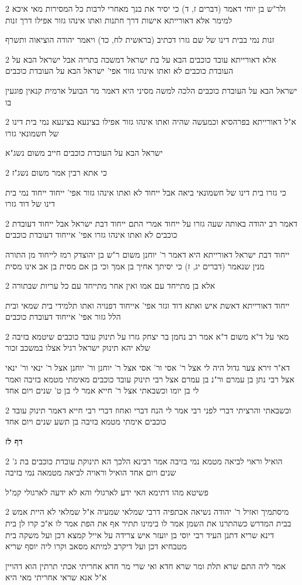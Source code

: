 \documentclass[12pt, openany]{book}
\newcommand{\sethebfont}{
\fontsize{10.5pt}{21.0pt} \selectfont
}
\newcommand{\twocol}[1]{
	{\sethebfont \begin{multicols}{2}
			#1
	\end{multicols}}	
}
\newcommand{\sectname}{}
\newcommand{\newsection}[1]{
	\addcontentsline{toc}{section}{#1}
	\renewcommand{\sectname}{#1}	
	\vspace{-\baselineskip}
	\begin{center}
		\textbf{%
\fontsize{16pt}{16pt}\selectfont
			#1}
	\end{center}
	\vspace{-\baselineskip}
	\nopagebreak
}
\begin{document}
\twocol{ולר"ש בן יוחי דאמר (דברים ז, ד) כי יסיר את בנך מאחרי לרבות כל המסירות מאי איכא למימר אלא דאורייתא אישות דרך חתנות ואתו אינהו גזור אפילו דרך זנות
\par זנות נמי בבית דינו של שם גזרו דכתיב (בראשית לח, כד) ויאמר יהודה הוציאוה ותשרף}
\twocol{אלא דאורייתא עובד כוכבים הבא על בת ישראל דמשכה בתריה אבל ישראל הבא על העובדת כוכבים לא ואתו אינהו גזור אפי' ישראל הבא על העובדת כוכבים
\par ישראל הבא על העובדת כוכבים הלכה למשה מסיני היא דאמר מר הבועל ארמית קנאין פוגעין בו}
\twocol{א"ל דאורייתא בפרהסיא וכמעשה שהיה ואתו אינהו גזור אפילו בצינעא בצינעא נמי בית דינו של חשמונאי גזרו
\par [דכי אתא רב דימי אמר ב"ד של חשמונאי גזרו] ישראל הבא על העובדת כוכבים חייב משום נשג"א}
\twocol{כי אתא רבין אמר משום נשג"ז
\par כי גזרו בית דינו של חשמונאי ביאה אבל ייחוד לא ואתו אינהו גזור אפי' ייחוד ייחוד נמי בית דינו של דוד גזרו}
\twocol{דאמר רב יהודה באותה שעה גזרו על ייחוד אמרי התם ייחוד דבת ישראל אבל ייחוד דעובדת כוכבים לא ואתו אינהו גזרו אפי' אייחוד דעובדת כוכבים
\par ייחוד דבת ישראל דאורייתא היא דאמר ר' יוחנן משום ר"ש בן יהוצדק רמז לייחוד מן התורה מנין שנאמר (דברים יג, ז) כי יסיתך אחיך בן אמך וכי בן אם מסית בן אב אינו מסית}
\twocol{אלא בן מתייחד עם אמו ואין אחר מתייחד עם כל עריות שבתורה
\par ייחוד דאורייתא דאשת איש ואתא דוד וגזר אפי' אייחוד דפנויה ואתו תלמידי בית שמאי ובית הלל גזור אפי' אייחוד דעובדת כוכבים}
\twocol{מאי על ד"א משום ד"א אמר רב נחמן בר יצחק גזרו על תינוק עובד כוכבים שיטמא בזיבה שלא יהא תינוק ישראל רגיל אצלו במשכב זכור
\par דא"ר זירא צער גדול היה לי אצל ר' אסי ור' אסי אצל ר' יוחנן ור' יוחנן אצל ר' ינאי ור' ינאי אצל רבי נתן בן עמרם ור"נ בן עמרם אצל רבי תינוק עובד כוכבים מאימתי מטמא בזיבה ואמר לי בן יומו וכשבאתי אצל ר' חייא אמר לי בן ט' שנים ויום אחד}
\twocol{וכשבאתי והרציתי דברי לפני רבי אמר לי הנח דברי ואחוז דברי רבי חייא דאמר תינוק עובד כוכבים אימתי מטמא בזיבה בן תשע שנים ויום אחד}
\newsection{דף לז}
\twocol{הואיל וראוי לביאה מטמא נמי בזיבה אמר רבינא הלכך הא תינוקת עובדת כוכבים בת ג' שנים ויום אחד הואיל וראויה לביאה מטמאה נמי בזיבה
\par פשיטא מהו דתימא האי ידע לארגולי והא לא ידעה לארגולי קמ"ל}
\twocol{מיסתמיך ואזיל ר' יהודה נשיאה אכתפיה דרבי שמלאי שמעיה א"ל שמלאי לא היית אמש בבית המדרש כשהתרנו את השמן אמר לו בימינו תתיר אף את הפת אמר לו א"כ קרו לן בית דינא שריא דתנן העיד רבי יוסי בן יועזר איש צרידה על אייל קמצא דכן ועל משקה בית מטבחיא דכן ועל דיקרב למיתא מסאב וקרו ליה יוסף שריא
\par אמר ליה התם שרא תלת ומר שרא חדא ואי שרי מר חדא אחריתי אכתי תרתין הוא דהויין א"ל אנא שראי אחריתי מאי היא}
\end{document}
